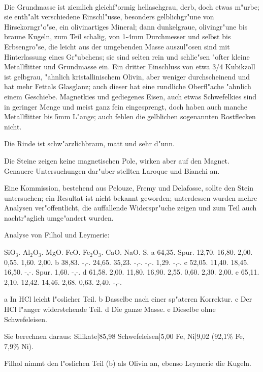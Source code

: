 \documentclass[a4paper, 11pt, oneside]{article}
\begin{document}
\paragraph{}
Die Grundmasse ist ziemlich gleichf"ormig hellaschgrau, derb, doch etwas m"urbe; sie enth"alt verschiedene Einschl"usse, besonders gelblichgr"une von Hirsekorngr"o"se, ein olivinartiges Mineral; dann dunkelgraue, olivingr"une bis braune Kugeln, zum Teil schalig, von 1-4mm Durchmesser und selbst bis Erbsengro"se, die leicht aus der umgebenden Masse auszul"osen sind mit Hinterlassung eines Gr"ubchens; sie sind selten rein und schlie"sen "ofter kleine Metallflitter und Grundmasse ein. Ein dritter Einschluss von etwa 3/4 Kubikzoll ist gelbgrau, "ahnlich kristallinischem Olivin, aber weniger durchscheinend und hat mehr Fettals Glasglanz; auch dieser hat eine rundliche Oberfl"ache "ahnlich einem Geschiebe. Magnetkies und gediegenes Eisen, auch etwas Schwefelkies sind in geringer Menge und meist ganz fein eingesprengt, doch haben auch manche Metallflitter bis 5mm L"ange; auch fehlen die gelblichen sogenannten Rostflecken nicht.

Die Rinde ist schw"arzlichbraun, matt und sehr d"unn.

Die Steine zeigen keine magnetischen Pole, wirken aber auf den Magnet. Genauere Untersuchungen dar"uber stellten Laroque und Bianchi an.

Eine Kommission, bestehend aus Pelouze, Fremy und Delafosse, sollte den Stein untersuchen; ein Resultat ist nicht bekannt geworden; unterdessen wurden mehre Analysen ver"offentlicht, die auffallende Widerspr"uche zeigen und zum Teil auch nachtr"aglich umge"andert wurden.

Analyse von Filhol und Leymerie:

SiO$_{3}$. Al$_{2}$O$_{3}$. MgO. FeO. Fe$_{2}$O$_{3}$. CaO. NaO. S.  
a 64,35. Spur. 12,70. 16,80. 2,00. 0,55. 1,60. 2,00.  
b 38,83. -,-. 24,65. 35,23. -,-. -,-. 1,29. -,-.  
c 52,05. 11,40. 18,45. 16,50. -,-. Spur. 1,60. -,-.  
d 61,58. 2,00. 11,80. 16,90. 2,55. 0,60. 2,30. 2,00.  
e 65,11. 2,10. 12,42. 14,46. 2,68. 0,63. 2,40. -,-.  

a In HCl leicht l"oslicher Teil. b Dasselbe nach einer sp"ateren Korrektur. c Der HCl l"anger widerstehende Teil. d Die ganze Masse. e Dieselbe ohne Schwefeleisen.

Sie berechnen daraus:  
Silikate|85,98  
Schwefeleisen|5,00  
Fe, Ni|9,02 (92,1\% Fe, 7,9\% Ni).

Filhol nimmt den l"oslichen Teil (b) als Olivin an, ebenso Leymerie die Kugeln.
\end{document}
